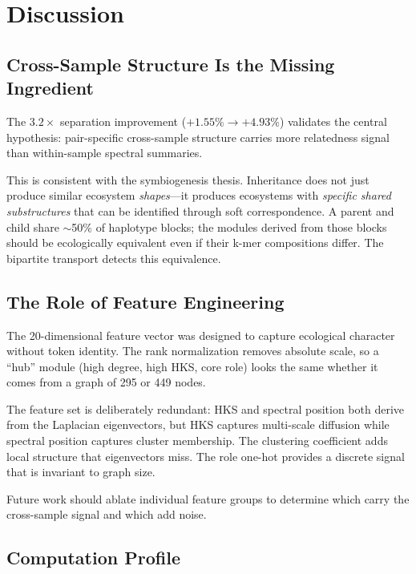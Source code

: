 \documentclass{../yalumba}
\begin{document}
\section{Discussion}
\label{sec:discussion}

\subsection{Cross-Sample Structure Is the Missing Ingredient}

The $3.2\times$ separation improvement ($+1.55\% \to +4.93\%$) validates the
central hypothesis: pair-specific cross-sample structure carries more
relatedness signal than within-sample spectral summaries.


This is consistent with the symbiogenesis thesis.  Inheritance does not just
produce similar ecosystem \emph{shapes}---it produces ecosystems with
\emph{specific shared substructures} that can be identified through soft
correspondence.  A parent and child share $\sim$50\% of haplotype blocks; the
modules derived from those blocks should be ecologically equivalent even if
their k-mer compositions differ.  The bipartite transport detects this
equivalence.

\subsection{The Role of Feature Engineering}

The 20-dimensional feature vector was designed to capture ecological character
without token identity.  The rank normalization removes absolute scale, so
a ``hub'' module (high degree, high HKS, core role) looks the same whether
it comes from a graph of 295 or 449 nodes.

The feature set is deliberately redundant: HKS and spectral position both
derive from the Laplacian eigenvectors, but HKS captures multi-scale diffusion
while spectral position captures cluster membership.  The clustering
coefficient adds local structure that eigenvectors miss.  The role one-hot
provides a discrete signal that is invariant to graph size.

Future work should ablate individual feature groups to determine which
carry the cross-sample signal and which add noise.

\subsection{Computation Profile}
\end{document}
